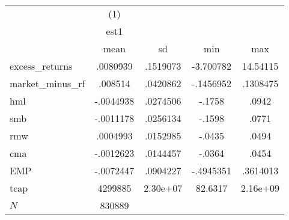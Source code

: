 {
\def\sym#1{\ifmmode^{#1}\else\(^{#1}\)\fi}
\begin{tabular}{l*{1}{cccc}}
\hline\hline
            &\multicolumn{1}{c}{(1)}&            &            &            \\
            &        est1&            &            &            \\
            &        mean&          sd&         min&         max\\
\hline
excess\_returns&    .0080939&    .1519073&   -3.700782&    14.54115\\
market\_minus\_rf&     .008514&    .0420862&   -.1456952&    .1308475\\
hml         &   -.0044938&    .0274506&      -.1758&       .0942\\
smb         &   -.0011178&    .0256134&      -.1598&       .0771\\
rmw         &    .0004993&    .0152985&      -.0435&       .0494\\
cma         &   -.0012623&    .0144457&      -.0364&       .0454\\
EMP         &   -.0072447&    .0904227&   -.4945351&    .3614013\\
tcap        &     4299885&    2.30e+07&     82.6317&    2.16e+09\\
\hline
\(N\)       &      830889&            &            &            \\
\hline\hline
\end{tabular}
}
